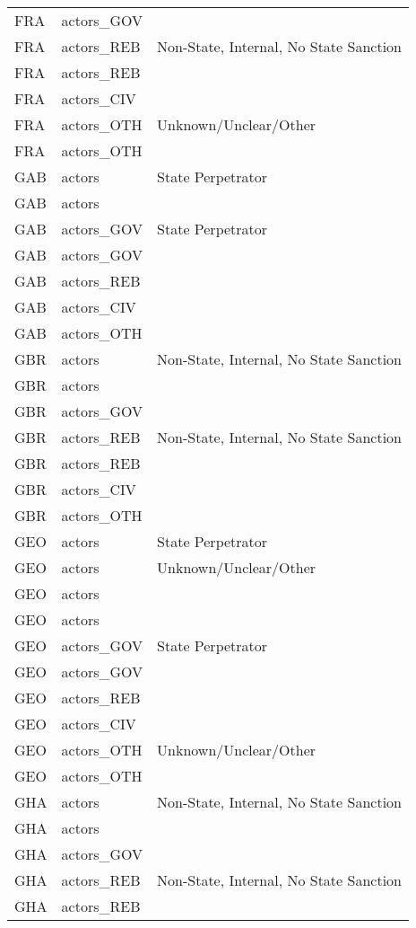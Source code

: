 \begin{table}[ht]
\begin{tabular}{lll}
  FRA & actors\_GOV &  \\ 
  FRA & actors\_REB & Non-State, Internal, No State Sanction \\ 
  FRA & actors\_REB &  \\ 
  FRA & actors\_CIV &  \\ 
  FRA & actors\_OTH & Unknown/Unclear/Other \\ 
  FRA & actors\_OTH &  \\ 
  GAB & actors & State Perpetrator \\ 
  GAB & actors &  \\ 
  GAB & actors\_GOV & State Perpetrator \\ 
  GAB & actors\_GOV &  \\ 
  GAB & actors\_REB &  \\ 
  GAB & actors\_CIV &  \\ 
  GAB & actors\_OTH &  \\ 
  GBR & actors & Non-State, Internal, No State Sanction \\ 
  GBR & actors &  \\ 
  GBR & actors\_GOV &  \\ 
  GBR & actors\_REB & Non-State, Internal, No State Sanction \\ 
  GBR & actors\_REB &  \\ 
  GBR & actors\_CIV &  \\ 
  GBR & actors\_OTH &  \\ 
  GEO & actors & State Perpetrator \\ 
  GEO & actors & Unknown/Unclear/Other \\ 
  GEO & actors &  \\ 
  GEO & actors &  \\ 
  GEO & actors\_GOV & State Perpetrator \\ 
  GEO & actors\_GOV &  \\ 
  GEO & actors\_REB &  \\ 
  GEO & actors\_CIV &  \\ 
  GEO & actors\_OTH & Unknown/Unclear/Other \\ 
  GEO & actors\_OTH &  \\ 
  GHA & actors & Non-State, Internal, No State Sanction \\ 
  GHA & actors &  \\ 
  GHA & actors\_GOV &  \\ 
  GHA & actors\_REB & Non-State, Internal, No State Sanction \\ 
  GHA & actors\_REB &  \\ 

\end{tabular}
\end{table}
